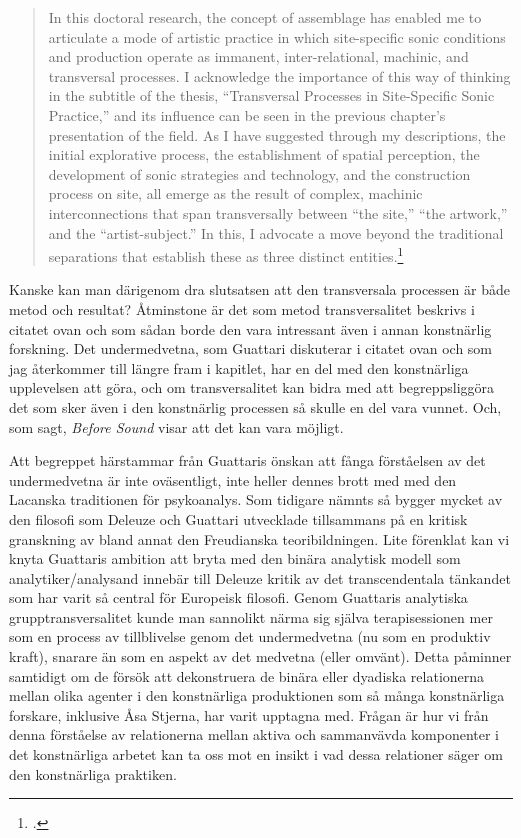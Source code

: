 \documentclass[11pt]{article}
\begin{document}
\begin{quote}
    In this doctoral research, the concept of assemblage has enabled
    me to articulate a mode of artistic practice in which
    site-specific sonic conditions and production operate as immanent,
    inter-relational, machinic, and transversal processes. I
    acknowledge the importance of this way of thinking in the subtitle
    of the thesis, “Transversal Processes in Site-Specific Sonic
    Practice,” and its influence can be seen in the previous chapter’s
    presentation of the field. As I have suggested through my
    descriptions, the initial explorative process, the establishment
    of spatial perception, the development of sonic strategies and
    technology, and the construction process on site, all emerge as
    the result of complex, machinic interconnections that span
    transversally between “the site,” “the artwork,” and the
    “artist-subject.” In this, I advocate a move beyond the
    traditional separations that establish these as three distinct
    entities.\footcite[sid. 92]{Stjerna2018}
\end{quote}

Kanske kan man därigenom dra slutsatsen att den transversala processen
är både metod och resultat? Åtminstone är det som metod
transversalitet beskrivs i citatet ovan och som sådan borde den vara
intressant även i annan konstnärlig forskning. Det undermedvetna, som Guattari
diskuterar i citatet ovan och som jag återkommer till längre fram i kapitlet, har en del med den konstnärliga upplevelsen
att göra, och om transversalitet kan bidra med att begreppsliggöra det
som sker även i den konstnärlig processen så skulle en del vara
vunnet. Och, som sagt, \emph{Before Sound} visar att det kan vara
möjligt.

Att begreppet härstammar från Guattaris önskan att fånga förståelsen
av det undermedvetna är inte oväsentligt, inte heller dennes brott med
med den Lacanska traditionen för psykoanalys. Som tidigare nämnts så
bygger mycket av den filosofi som Deleuze och Guattari utvecklade
tillsammans på en kritisk granskning av bland annat den Freudianska
teoribildningen. Lite förenklat kan vi knyta Guattaris ambition att
bryta med den binära analytisk modell som analytiker/analysand
innebär till Deleuze kritik av det transcendentala tänkandet som har
varit så central för Europeisk filosofi. Genom Guattaris analytiska
grupptransversalitet kunde man sannolikt närma sig själva
terapisessionen mer som en process av tillblivelse genom det
undermedvetna (nu som en produktiv kraft), snarare än som en aspekt av
det medvetna (eller omvänt). Detta påminner samtidigt om de försök att
dekonstruera de binära eller dyadiska relationerna mellan olika
agenter i den konstnärliga produktionen som så många konstnärliga
forskare, inklusive Åsa Stjerna, har varit upptagna med. Frågan är hur
vi från denna förståelse av relationerna mellan aktiva och sammanvävda
komponenter i det konstnärliga arbetet kan ta oss mot en insikt i vad
dessa relationer säger om den konstnärliga praktiken.
\end{document}
